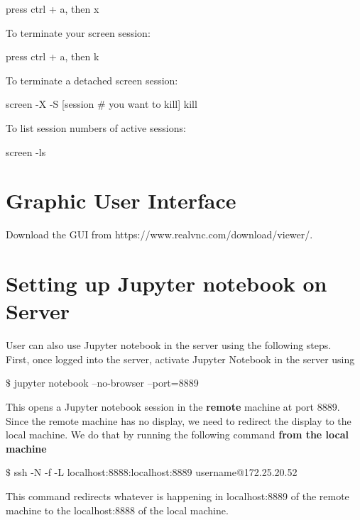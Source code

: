 \begin{mdframed}
press ctrl + a, then x
\end{mdframed}

To terminate your screen session:
\begin{mdframed}
press ctrl + a, then k
\end{mdframed}

To terminate a detached screen session:
\begin{mdframed}
screen -X -S [session \# you want to kill] kill
\end{mdframed}

To list session numbers of active sessions:
\begin{mdframed}
screen -ls
\end{mdframed}

\section{Graphic User Interface}

Download the GUI from https://www.realvnc.com/download/viewer/.\\

\section{Setting up Jupyter notebook on Server}
User can also use Jupyter notebook in the server using the following steps.\\

First, once logged into the server, activate Jupyter Notebook in the server using

\begin{framed}
$\$$ jupyter notebook --no-browser --port=8889
\end{framed}

This opens a Jupyter notebook session in the \textbf{remote} machine at port 8889. Since the remote machine has no display, we need to redirect the display to the local machine. We do that by running the following command \textbf{from the local machine}

\begin{framed}
$\$$ ssh -N -f -L localhost:8888:localhost:8889 username@172.25.20.52
\end{framed}

This command redirects whatever is happening in localhost:8889 of the remote machine to the localhost:8888 of the local machine. \\

